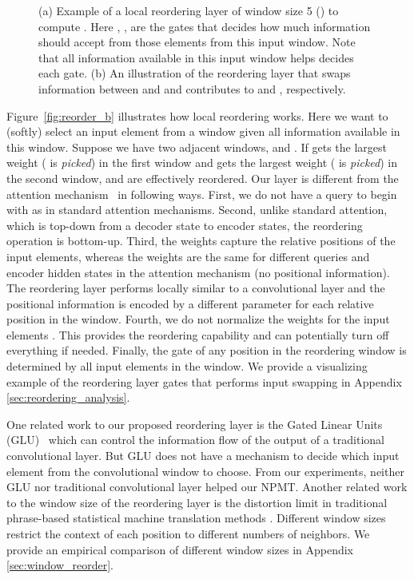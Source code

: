 \documentclass{article}
\begin{document}
\begin{figure} \centering
  \caption{\small{(a) Example of a local reordering layer of window size 5 () to
  compute . Here , , are the
  gates that decides how much information  should accept from those
  elements from this input window. Note that all information available in this
  input window helps decides each gate. (b) An illustration of the reordering
  layer that swaps information between  and  and contributes to 
  and , respectively.}}
	\label{fig:reordering}
\end{figure}

Figure~\ref{fig:reorder_b} illustrates how local reordering works. Here we want
to (softly) select an input element from a window given all information available
in this window.  Suppose we have two adjacent windows,  and
. 
If  gets the largest weight ( is {\it picked}) in the first window and  gets the largest weight ( is {\it picked}) in the second window,
 and  are effectively reordered.
Our layer is different from
the attention
mechanism~\citep{Bahdanau:2014,luong2015effective,raffel2017online,vaswani2017attention}
in following ways.  
First, we do not have a query to begin with as in standard attention mechanisms. 
Second, unlike standard attention, which is top-down from a decoder state to encoder states, the reordering operation is bottom-up. 
Third, the weights  capture the relative positions of the input elements, whereas the weights are the same for different queries and encoder hidden states in the attention mechanism (no positional information). 
The reordering layer performs locally similar to a convolutional layer and the positional information is encoded by a different parameter  for each relative position  in the window. 
Fourth, we do not normalize the weights for the input elements . 
This provides the reordering capability and can potentially turn off everything if needed. 
Finally, the gate of any position  in the reordering window is determined by all input elements  in the window. 
We provide a visualizing example of the reordering layer
gates that performs input swapping in Appendix \ref{sec:reordering_analysis}.

One related work to our proposed reordering layer is the Gated Linear Units
(GLU)~\citep{dauphin2016language} which can control the information flow of the
output of a traditional convolutional layer. But GLU does not have a mechanism
to decide which input element from the convolutional window to choose. From our
experiments, neither GLU nor traditional convolutional layer helped our NPMT.
Another related work to the window size of the reordering layer is the distortion limit in traditional phrase-based statistical machine translation methods \citep{brown1993mathematics}. 
Different window sizes restrict the context of each position to different numbers of neighbors. 
We provide an empirical comparison of different window sizes in Appendix \ref{sec:window_reorder}. 
\end{document}
